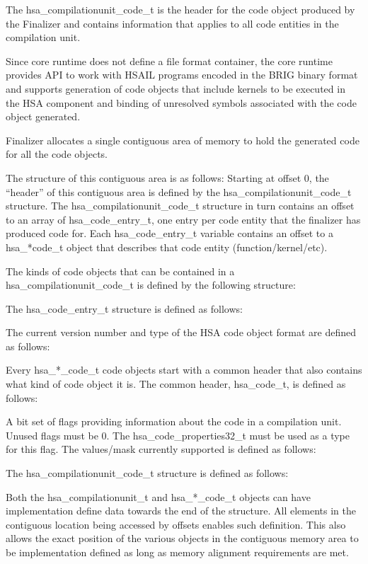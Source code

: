 \documentclass[draft]{book}
\newcommand{\reftyp}[1]{#1}
\begin{document}
\begin{appendices}
The \reftyp{hsa_compilationunit_code_t} is the header for the code object
produced by the Finalizer and contains information that applies to all code
entities in the compilation unit.

Since core runtime does not define a file format container, the core runtime
provides API to work with HSAIL programs encoded in the BRIG binary format and
supports generation of code objects that include kernels to be executed in the
HSA component and binding of unresolved symbols associated with the code object
generated.

Finalizer allocates a single contiguous area of memory to hold the generated
code for all the code objects.

The structure of this contiguous area is as follows: Starting at offset 0, the
``header'' of this contiguous area is defined by the
\reftyp{hsa_compilationunit_code_t} structure. The
\reftyp{hsa_compilationunit_code_t} structure in turn contains an offset to
an array of \reftyp{hsa_code_entry_t}, one entry per code entity that the
finalizer has produced code for. Each \reftyp{hsa_code_entry_t} variable
contains an offset to a \reftyp{hsa_*code_t} object that describes that code
entity (function/kernel/etc).

The kinds of code objects that can be contained in a
\reftyp{hsa_compilationunit_code_t} is defined by the following
structure:


The \reftyp{hsa_code_entry_t} structure is defined as follows:


The current version number and type of the HSA code object format are defined as
follows:



Every \reftyp{hsa_*_code_t} code objects start with a common header that also
contains what kind of code object it is. The common header,
\reftyp{hsa_code_t}, is defined as follows:


A bit set of flags providing information about the code in a compilation
unit. Unused flags must be 0. The \reftyp{hsa_code_properties32_t} must be
used as a type for this flag. The values/mask currently supported is defined as
follows: 

The \reftyp{hsa_compilationunit_code_t} structure is defined as
follows:


Both the \reftyp{hsa_compilationunit_t} and \reftyp{hsa_*_code_t} objects
can have implementation define data towards the end of the structure. All
elements in the contiguous location being accessed by offsets enables such
definition. This also allows the exact position of the various objects in the
contiguous memory area to be implementation defined as long as memory alignment
requirements are met.


\end{appendices}
\end{document}
